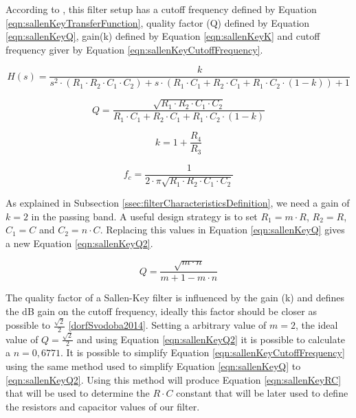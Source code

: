 		According to \cite{texas1999sallenkey}, this filter setup has a cutoff frequency defined by Equation \ref{eqn:sallenKeyTransferFunction}, quality factor (Q) defined by Equation \ref{eqn:sallenKeyQ}, gain(k) defined by Equation \ref{eqn:sallenKeyK} and cutoff frequency giver by Equation \ref{eqn:sallenKeyCutoffFrequency}.

		\begin{equation}\label{eqn:sallenKeyTransferFunction}
			H(s)=\frac{k}{s^{2} \cdot \left( R_{1} \cdot R_{2} \cdot C_{1} \cdot C_{2} \right) + s \cdot \left( R_{1} \cdot C_{1} + R_{2} \cdot C_{1} + R_{1} \cdot C_{2} \cdot \left( 1 - k \right) \right) + 1} 
		\end{equation}

		\begin{equation}\label{eqn:sallenKeyQ}
			Q=\frac{\sqrt{R_{1} \cdot R_{2} \cdot C_{1} \cdot C_{2}}}{R_{1} \cdot C_{1} + R_{2} \cdot C_{1} + R_{1} \cdot C_{2} \cdot \left( 1 - k \right)}
		\end{equation}

		\begin{equation}\label{eqn:sallenKeyK}
			k=1 + \frac{R_{4}}{R_{3}}
		\end{equation}

		\begin{equation}\label{eqn:sallenKeyCutoffFrequency}
			f_{c}=\frac{1}{2 \cdot \pi \sqrt{R_{1} \cdot R_{2} \cdot C_{1} \cdot C_{2}}} 
		\end{equation}


		As explained in Subsection \ref{ssec:filterCharacteristicsDefinition}, we need a gain of $k=2$ in the passing band. A useful design strategy is to set $R_{1}= m \cdot R$, $R_{2}=R$, $C_{1}=C$ and $C_{2}= n \cdot C$. Replacing this values in Equation \ref{eqn:sallenKeyQ} gives a new Equation \ref{eqn:sallenKeyQ2}.

		\begin{equation}\label{eqn:sallenKeyQ2}
			Q=\frac{\sqrt{m \cdot n}}{m + 1 - m \cdot n}
		\end{equation}

		The quality factor of a Sallen-Key filter is influenced by the gain (k) and defines the dB gain on the cutoff frequency, ideally this factor should be closer as possible to $\frac{\sqrt{2}}{2}$ \ref{dorfSvodoba2014}. Setting a arbitrary value of $m=2$, the ideal value of $Q=\frac{\sqrt{2}}{2}$ and using Equation \ref{eqn:sallenKeyQ2} it is possible to calculate a $n=0,6771$. It is possible to simplify Equation \ref{eqn:sallenKeyCutoffFrequency} using the same method used to simplify Equation \ref{eqn:sallenKeyQ} to \ref{eqn:sallenKeyQ2}. Using this method will produce Equation \ref{eqn:sallenKeyRC} that will be used to determine the $R \cdot C$ constant that will be later used to define the resistors and capacitor values of our filter. 

